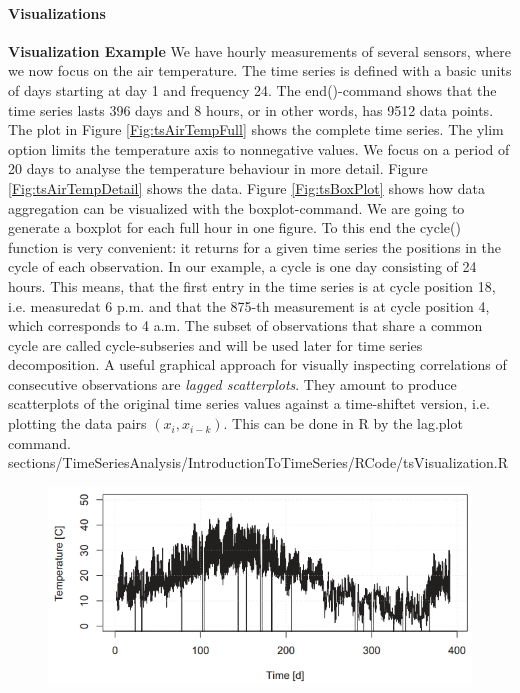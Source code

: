 {{\paragraph{Visualizations}
\RTheory
{\textbf{Visualization Example}\vfill
We have hourly measurements of several sensors, where we now focus on the air temperature. The time series is defined with a basic units of days starting at day 1 and frequency 24. The {\color{blue}end()}-command shows that the time series lasts 396 days and 8 hours, or in other words, has 9512 data points. The plot in Figure \ref{Fig:tsAirTempFull} shows the complete time series. The {\color{blue}ylim} option limits the temperature axis to nonnegative values.
\vfill
\hfill
\break
We focus on a period of 20 days to analyse the temperature behaviour in more detail. Figure \ref{Fig:tsAirTempDetail} shows the data.
\vfill
\hfill
\break
Figure \ref{Fig:tsBoxPlot} shows how data aggregation can be visualized with the {\color{blue}boxplot}-command. We are going to generate a boxplot for each full hour in one figure. To this end the {\color{blue}cycle()} function is very convenient: it returns for a given time series the positions in the cycle of each observation. In our example, a cycle is one day consisting of 24 hours. This means, that the first entry in the time series is at cycle position 18, i.e. measuredat 6 p.m. and that the 875-th measurement is at cycle position 4, which corresponds to 4 a.m. The subset of observations that share a common cycle are called cycle-subseries and will be used later for time series decomposition.
\vfill
\hfill
\break
A useful graphical approach for visually inspecting correlations of consecutive observations are \textit{lagged scatterplots}. They amount to produce scatterplots of the original time series values against a time-shiftet version, i.e. plotting the data pairs $(x_i, x_{i-k})$.
This can be done in {\color{blue}R} by the {\color{blue}lag.plot} command.
}
{sections/TimeSeriesAnalysis/IntroductionToTimeSeries/RCode/tsVisualization.R}
\begin{figure}[H]\centering
	\begin{minipage}[c]{0.42\textwidth}
		\includegraphics[width=1\linewidth]{images/tsAirTempFull.png}

\end{minipage}
\end{figure}}}

